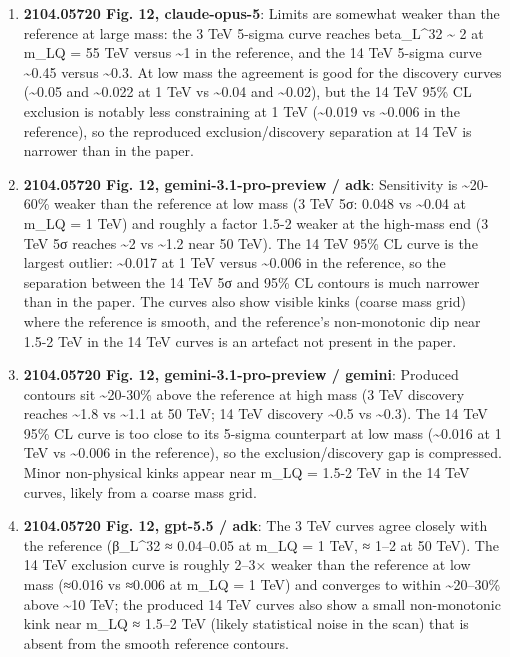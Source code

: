 \begin{enumerate}
\item \textbf{2104.05720 Fig. 12, claude-opus-5}: Limits are somewhat weaker than the reference at large mass: the 3 TeV 5-sigma curve reaches beta\_L\textasciicircum{}32 \textasciitilde{} 2 at m\_LQ = 55 TeV versus \textasciitilde{}1 in the reference, and the 14 TeV 5-sigma curve \textasciitilde{}0.45 versus \textasciitilde{}0.3. At low mass the agreement is good for the discovery curves (\textasciitilde{}0.05 and \textasciitilde{}0.022 at 1 TeV vs \textasciitilde{}0.04 and \textasciitilde{}0.02), but the 14 TeV 95\% CL exclusion is notably less constraining at 1 TeV (\textasciitilde{}0.019 vs \textasciitilde{}0.006 in the reference), so the reproduced exclusion/discovery separation at 14 TeV is narrower than in the paper.
\item \textbf{2104.05720 Fig. 12, gemini-3.1-pro-preview / adk}: Sensitivity is \textasciitilde{}20-60\% weaker than the reference at low mass (3 TeV 5σ: 0.048 vs \textasciitilde{}0.04 at m\_LQ = 1 TeV) and roughly a factor 1.5-2 weaker at the high-mass end (3 TeV 5σ reaches \textasciitilde{}2 vs \textasciitilde{}1.2 near 50 TeV). The 14 TeV 95\% CL curve is the largest outlier: \textasciitilde{}0.017 at 1 TeV versus \textasciitilde{}0.006 in the reference, so the separation between the 14 TeV 5σ and 95\% CL contours is much narrower than in the paper. The curves also show visible kinks (coarse mass grid) where the reference is smooth, and the reference's non-monotonic dip near 1.5-2 TeV in the 14 TeV curves is an artefact not present in the paper.
\item \textbf{2104.05720 Fig. 12, gemini-3.1-pro-preview / gemini}: Produced contours sit \textasciitilde{}20-30\% above the reference at high mass (3 TeV discovery reaches \textasciitilde{}1.8 vs \textasciitilde{}1.1 at 50 TeV; 14 TeV discovery \textasciitilde{}0.5 vs \textasciitilde{}0.3). The 14 TeV 95\% CL curve is too close to its 5-sigma counterpart at low mass (\textasciitilde{}0.016 at 1 TeV vs \textasciitilde{}0.006 in the reference), so the exclusion/discovery gap is compressed. Minor non-physical kinks appear near m\_LQ = 1.5-2 TeV in the 14 TeV curves, likely from a coarse mass grid.
\item \textbf{2104.05720 Fig. 12, gpt-5.5 / adk}: The 3 TeV curves agree closely with the reference (β\_L\textasciicircum{}32 ≈ 0.04–0.05 at m\_LQ = 1 TeV, ≈ 1–2 at 50 TeV). The 14 TeV exclusion curve is roughly 2–3× weaker than the reference at low mass (≈0.016 vs ≈0.006 at m\_LQ = 1 TeV) and converges to within \textasciitilde{}20–30\% above \textasciitilde{}10 TeV; the produced 14 TeV curves also show a small non-monotonic kink near m\_LQ ≈ 1.5–2 TeV (likely statistical noise in the scan) that is absent from the smooth reference contours.

\end{enumerate}
